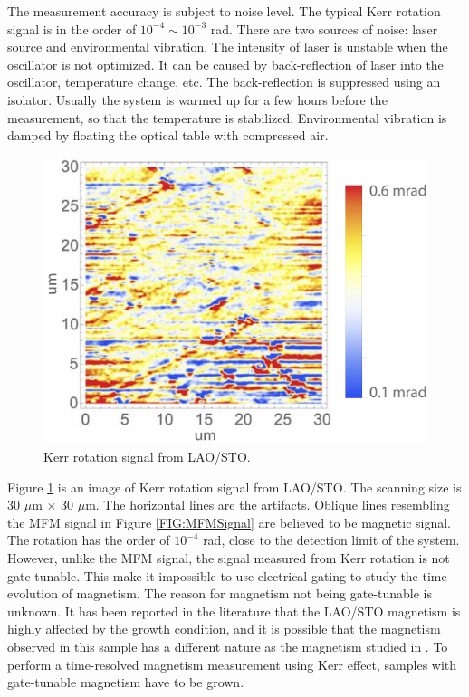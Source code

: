 \documentclass[pdflatex, sectionletters, 12pt]{pittetd}    %
\begin{document}
The measurement accuracy is subject to noise level. The typical Kerr rotation signal is in the order of $10^{-4} \sim 10^{-3}$ rad. There are two sources of noise: laser source and environmental vibration. The intensity of laser is unstable when the oscillator is not optimized. It can be caused by back-reflection of laser into the oscillator, temperature change, etc. The back-reflection is suppressed using an isolator. Usually the system is warmed up for a few hours before the measurement, so that the temperature is stabilized. Environmental vibration is damped by floating the optical table with compressed air.
\\

\begin{figure}[h!]
	\centering
	\includegraphics[width=.6\textwidth]{Drawing/KerrLAOSTO.pdf}
	\caption{Kerr rotation signal from LAO/STO.}
	\label{FIG:KerrLAOSTO}
\end{figure}

Figure \ref{FIG:KerrLAOSTO} is an image of Kerr rotation signal from LAO/STO. The scanning size is 30 $\mu$m $\times$ 30 $\mu$m. The horizontal lines are the artifacts. Oblique lines resembling the MFM signal in Figure \ref{FIG:MFMSignal} are believed to be magnetic signal. The rotation has the order of $10^{-4}$ rad, close to the detection limit of the system. However, unlike the MFM signal, the signal measured from Kerr rotation is not gate-tunable. This make it impossible to use electrical gating to study the time-evolution of magnetism. The reason for magnetism not being gate-tunable is unknown. It has been reported in the literature that the LAO/STO magnetism is highly affected by the growth condition\cite{ariando2011electronic, salluzzo2013origin, huijben2009structure, liu2014dominant}, and it is possible that the magnetism observed in this sample has a different nature as the magnetism studied in \cite{bi2014room}. To perform a time-resolved magnetism measurement using Kerr effect, samples with gate-tunable magnetism have to be grown.
\end{document}

